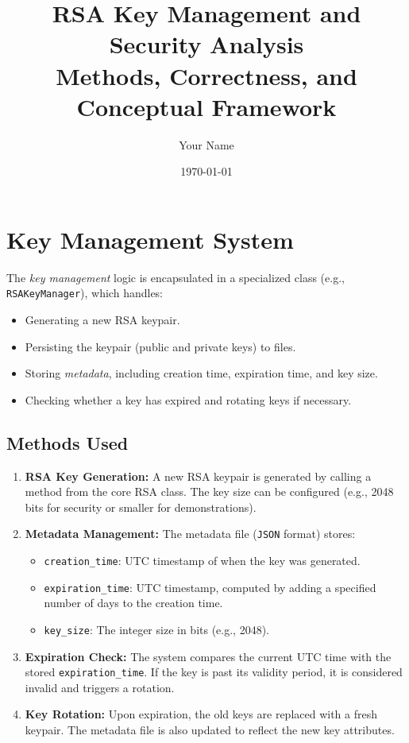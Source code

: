 \documentclass[12pt]{article}
\title{RSA Key Management and Security Analysis \\
       \large Methods, Correctness, and Conceptual Framework}
\author{Your Name}
\date{\today}
\begin{document}
\maketitle

\tableofcontents
\clearpage


\section{Key Management System}
The \emph{key management} logic is encapsulated in a specialized class (e.g., \texttt{RSAKeyManager}), which handles:
\begin{itemize}
    \item Generating a new RSA keypair.
    \item Persisting the keypair (public and private keys) to files.
    \item Storing \emph{metadata}, including creation time, expiration time, and key size.
    \item Checking whether a key has expired and rotating keys if necessary.
\end{itemize}

\subsection{Methods Used}
\begin{enumerate}
    \item \textbf{RSA Key Generation:} 
    A new RSA keypair is generated by calling a method from the core RSA class. The key size can be configured (e.g., 2048 bits for security or smaller for demonstrations).
    
    \item \textbf{Metadata Management:}
    The metadata file (\texttt{JSON} format) stores:
    \begin{itemize}
        \item \texttt{creation\_time}: UTC timestamp of when the key was generated.
        \item \texttt{expiration\_time}: UTC timestamp, computed by adding a specified number of days to the creation time.
        \item \texttt{key\_size}: The integer size in bits (e.g., 2048).
    \end{itemize}

    \item \textbf{Expiration Check:}
    The system compares the current UTC time with the stored \texttt{expiration\_time}. If the key is past its validity period, it is considered invalid and triggers a rotation.

    \item \textbf{Key Rotation:}
    Upon expiration, the old keys are replaced with a fresh keypair. The metadata file is also updated to reflect the new key attributes.
\end{enumerate}
\end{document}
